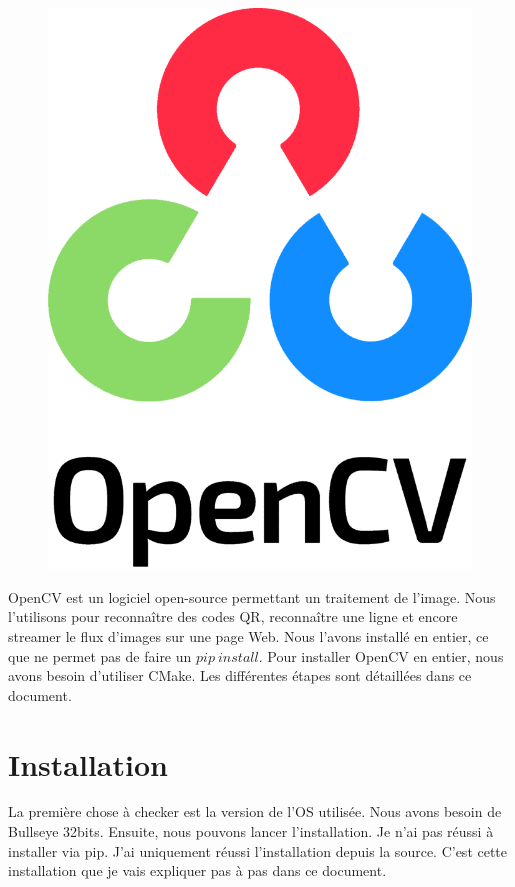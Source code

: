 \documentclass[
	a4paper,									%
	11pt,										%
	twoside,									%
	openright,									%
	notitlepage,									%
	parskip=half,								%
]{scrreprt}										%
\begin{document}
\begin{figure}[!ht]
	\centering
	\includegraphics[scale=.2]{img/OpenCV.png}
	\label{OpenCV}
\end{figure}

OpenCV est un logiciel open-source permettant un traitement de l'image. Nous l'utilisons pour reconnaître des codes QR,
reconnaître une ligne et encore streamer le flux d'images sur une page Web. Nous l'avons installé en entier, ce que 
ne permet pas de faire un $pip\ install$. Pour installer OpenCV en entier, nous avons besoin d'utiliser CMake. 
Les différentes étapes sont détaillées dans ce document.

\chapter{Installation}

La première chose à checker est la version de l'OS utilisée. Nous avons besoin de Bullseye 32bits. 
Ensuite, nous pouvons lancer l'installation. Je n'ai pas réussi à installer via pip. J'ai uniquement réussi 
l'installation depuis la source. C'est cette installation que je vais expliquer pas à pas dans ce document. \par
\end{document}
